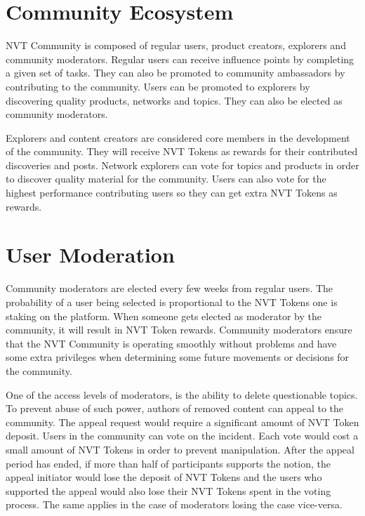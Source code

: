 
\section{Community Ecosystem}

NVT Community is composed of regular users, product creators, explorers and community moderators. Regular users can receive influence points by completing a given set of tasks. They can also be promoted to community ambassadors by contributing to the community. Users can be promoted to explorers by discovering quality products, networks and topics. They can also be elected as community moderators.

Explorers and content creators are considered core members in the development of the community. They will receive NVT Tokens as rewards for their contributed discoveries and posts. Network explorers can vote for topics and products in order to discover quality material for the community. Users can also vote for the highest performance contributing users so they can get extra NVT Tokens as rewards.


\section{User Moderation}

Community moderators are elected every few weeks from regular users. The probability of a user being selected is proportional to the NVT Tokens one is staking on the platform. When someone gets elected as moderator by the community, it will result in NVT Token rewards. Community moderators ensure that the NVT Community is operating smoothly without problems and have some extra privileges when determining some future movements or decisions for the community.

One of the access levels of moderators, is the ability to delete questionable topics. To prevent abuse of such power, authors of removed content can appeal to the community. The appeal request would require a significant amount of NVT Token deposit. Users in the community can vote on the incident. Each vote would cost a small amount of NVT Tokens in order to prevent manipulation. After the appeal period has ended, if more than half of participants supports the notion, the appeal initiator would lose the deposit of NVT Tokens and the users who supported the appeal would also lose their NVT Tokens spent in the voting process. The same applies in the case of moderators losing the case vice-versa.

